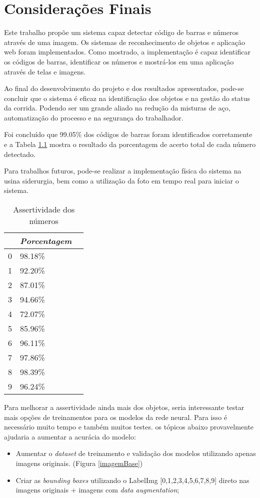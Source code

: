 \chapter{Considerações Finais}

 Este trabalho propõe um sistema capaz detectar código de barras e números através de uma imagem. Os sistemas de reconhecimento de objetos e aplicação web foram implementados. Como mostrado, a implementação é capaz identificar os códigos de barras, identificar os números e mostrá-los em uma aplicação através de telas e imagens.
 
Ao final do desenvolvimento do projeto e dos resultados apresentados, pode-se concluir que o sistema é eficaz na identificação dos objetos e na gestão do status da corrida. Podendo ser um grande aliado na redução da misturas de aço, automatização do processo e na segurança do trabalhador.

Foi concluído que 99.05\% dos códigos de barras foram identificados corretamente e a Tabela \ref{tab:numberRecognize} mostra o resultado da porcentagem de acerto total de cada número detectado.

Para trabalhos futuros, pode-se realizar a implementação física do sistema na usina siderurgia, bem como a utilização da foto em tempo real para iniciar o sistema. 

\begin{table}[H]
	\centering
	\begin{tabular}{|l|l|l|}
		\hline
		\rowcolor[HTML]{ECF4FF} 
		\multicolumn{1}{|c|}{\cellcolor[HTML]{ECF4FF}\textit{\textit{Número}}} &
		\multicolumn{1}{|c|}{\cellcolor[HTML]{ECF4FF}\textit{Porcentagem}}\\ \hline 
		0&  98.18\% \\ \hline
		1&  92.20\% \\ \hline
		2&  87.01\% \\ \hline
		3&  94.66\%\\ \hline
		4&  72.07\% \\ \hline
		5&  85.96\% \\ \hline
		6&  96.11\% \\ \hline
		7&  97.86\% \\ \hline
		8&  98.39\% \\ \hline
		9&  96.24\% \\ \hline
	\end{tabular}
	\caption{Assertividade dos números}
	\label{tab:numberRecognize}
\end{table}

Para melhorar a assertividade ainda mais dos objetos, seria interessante testar mais opções de treinamentos para os modelos da rede neural. Para isso é necessário muito tempo e também muitos testes. os tópicos abaixo provavelmente ajudaria a aumentar a acurácia do modelo:

\begin{itemize}
    \item Aumentar o \textit{dataset} de treinamento e validação dos modelos utilizando apenas imagens originais. (Figura \ref{imagemBase})
    \item Criar as \textit{bounding boxes} utilizando o LabelImg [0,1,2,3,4,5,6,7,8,9] direto nas imagens originais + imagens com \textit{data augmentation};
\end{itemize}
